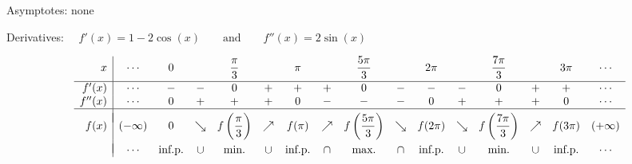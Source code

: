 \begin{Answer}
    	\Question Asymptotes: \quad none\par
                Derivatives: $\quad f'(x)=1-2\cos (x) \qquad\mbox{and}\qquad f''(x)=2\sin (x)$
                   \begin{footnotesize}
                \[ \begin{array}{r|ccccccccccccccc}
                x & \cdots &0 & & \dfrac{\pi}{3} & & \pi & & \dfrac{5\pi}{3} & & 2\pi & & \dfrac{7\pi}{3} & &  3 \pi& \cdots \\[0.2cm]
                \hline
                f'(x) & \cdots  & - & - & 0 & + & + & + & 0 & - & - & - & 0 & + & + & \cdots \\
                f''(x) & \cdots& 0 & + & + & + & 0 & - & - & - & 0 & + & + & + & 0 & \cdots\\
                \hline
                &&&&&\vspace{-0.3cm}\\
                f(x) & (-\infty) & 0 & \searrow & f\left(\dfrac{\pi}{3}\right) & \nearrow & f(\pi) & \nearrow & f\left(\dfrac{5\pi}{3}\right) & \searrow & f(2\pi) & \searrow & f\left(\dfrac{7\pi}{3}\right)& \nearrow &  f(3\pi) & (+\infty)  \\
                &&&&&\vspace{-0.3cm}\\                                                                      
                    & \cdots  & \mbox{inf.p.}& \cup& \mbox{min.} & \cup & \mbox{inf.p.} & \cap & \mbox{max.}& \cap & \mbox{inf.p.}  &\cup& \mbox{min.} & \cup & \mbox{inf.p.} &  \cdots \\
                \end{array}\]
                   \end{footnotesize}
                

\end{Answer}
